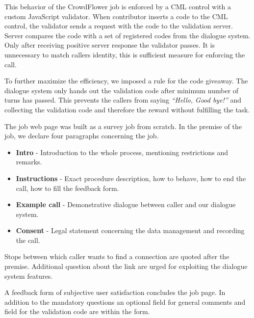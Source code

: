 This behavior of the CrowdFlower job is enforced by a CML control with a custom JavaScript validator.
When contributor inserts a code to the CML control, the validator sends a request with the code to the validation server.
Server compares the code with a set of registered codes from the dialogue system.
Only after receiving positive server response the validator passes.
It is unnecessary to match callers identity, this is sufficient measure for enforcing the call.

To further maximize the efficiency, we imposed a rule for the code giveaway.
The dialogue system only hands out the validation code after minimum number of turns has passed.
This prevents the callers from saying \textit{``Hello, Good bye!''} and collecting the validation code and therefore the reward without fulfilling the task.

The job web page was built as a survey job from scratch.
In the premise of the job, we declare four paragraphs concerning the job.

\begin{itemize}
	\item \textbf{Intro} - Introduction to the whole process, mentioning restrictions and remarks. %
	\item \textbf{Instructions} - Exact procedure description,  how to behave, how to end the call, how to fill the feedback form.
	\item \textbf{Example call} - Demonstrative dialogue between caller and our dialogue system.
	\item \textbf{Consent} - Legal statement concerning the data management and recording the call.
\end{itemize}


Stops between which caller wants to find a connection are quoted after the premise.
Additional question about the link are urged for exploiting the dialogue system features.

A feedback form of subjective user satisfaction concludes the job page.
In addition to the mandatory questions an optional field for general comments and field for the validation code are within the form.

